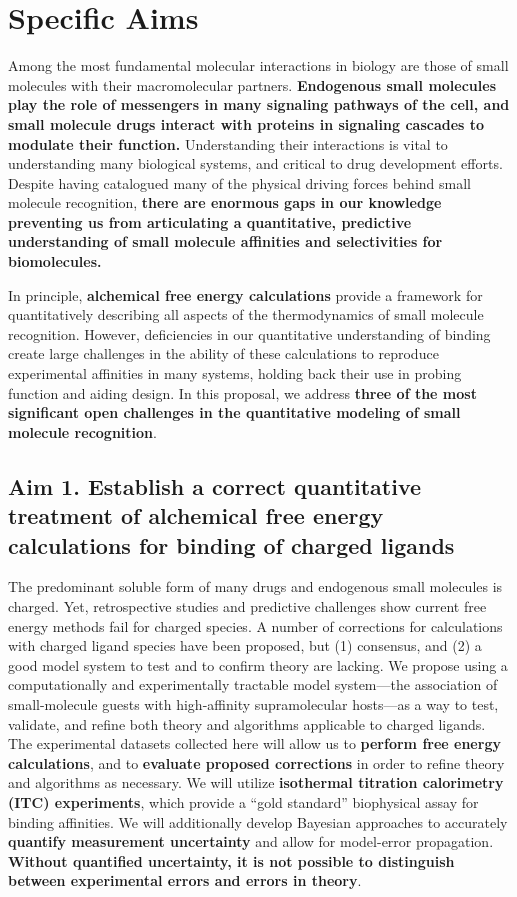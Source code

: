 \documentclass[10pt,final]{article}
\date{}
\begin{document}
\newpage
\section*{\centering Specific Aims}
Among the most fundamental molecular interactions in biology are those of small molecules with their macromolecular partners.
\textbf{Endogenous small molecules play the role of messengers in many signaling pathways of the cell, and small molecule drugs interact with proteins in signaling cascades to modulate their function.}
Understanding their interactions is vital to understanding many biological systems, and critical to drug development efforts.
Despite having catalogued many of the physical driving forces behind small molecule recognition, \textbf{there are enormous gaps in our knowledge preventing us from articulating a quantitative, predictive understanding of small molecule affinities and selectivities for biomolecules.}

In principle, \textbf{alchemical free energy calculations} provide a framework for quantitatively describing all aspects of the thermodynamics of small molecule recognition. However, deficiencies in our quantitative understanding of binding create large challenges in the ability of these calculations to reproduce experimental affinities in many systems, holding back their use in probing function and aiding design.
In this proposal, we address \textbf{three of the most significant open challenges in the quantitative modeling of small molecule recognition}.

\subsection*{Aim 1. Establish a correct quantitative treatment of alchemical free energy calculations for binding of charged ligands}
The predominant soluble form of many drugs and endogenous small molecules is charged.
Yet, retrospective studies and predictive challenges show current free energy methods fail for charged species\cite{Rocklin2013b,Muddana2014a}.
A number of corrections for calculations with charged ligand species have been proposed\cite{Reif2013a,Rocklin2013a, Lin2014a}, but (1) consensus, and (2) a good model system to test and to confirm theory are lacking.
We propose using a computationally and experimentally tractable model system---the association of small-molecule guests with high-affinity supramolecular hosts---as a way to test, validate, and refine both theory and algorithms applicable to charged ligands.
The experimental datasets collected here will allow us to \textbf{ perform free energy calculations}, and to \textbf{ evaluate proposed corrections} in order to refine theory and algorithms as necessary.
We will utilize \textbf{ isothermal titration calorimetry (ITC) experiments}, which provide a “gold standard” biophysical assay for binding affinities.
We will additionally develop Bayesian approaches to accurately \textbf{ quantify measurement uncertainty} and allow for model-error propagation. \textbf{Without quantified uncertainty, it is not possible to distinguish between experimental errors and errors in theory}.
\end{document}
